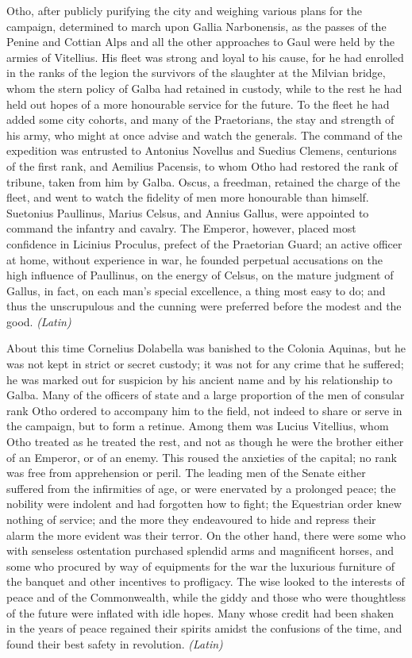 Otho, after publicly purifying the city and weighing various plans for the campaign, determined to march upon Gallia Narbonensis, as the passes of the Penine and Cottian Alps and all the other approaches to Gaul were held by the armies of Vitellius. His fleet was strong and loyal to his cause, for he had enrolled in the ranks of the legion the survivors of the slaughter at the Milvian bridge, whom the stern policy of Galba had retained in custody, while to the rest he had held out hopes of a more honourable service for the future. To the fleet he had added some city cohorts, and many of the Praetorians, the stay and strength of his army, who might at once advise and watch the generals. The command of the expedition was entrusted to Antonius Novellus and Suedius Clemens, centurions of the first rank, and Aemilius Pacensis, to whom Otho had restored the rank of tribune, taken from him by Galba. Oscus, a freedman, retained the charge of the fleet, and went to watch the fidelity of men more honourable than himself. Suetonius Paullinus, Marius Celsus, and Annius Gallus, were appointed to command the infantry and cavalry. The Emperor, however, placed most confidence in Licinius Proculus, prefect of the Praetorian Guard; an active officer at home, without experience in war, he founded perpetual accusations on the high influence of Paullinus, on the energy of Celsus, on the mature judgment of Gallus, in fact, on each man's special excellence, a thing most easy to do; and thus the unscrupulous and the cunning were preferred before the modest and the good. \emph{(Latin)}


About this time Cornelius Dolabella was banished to the Colonia Aquinas, but he was not kept in strict or secret custody; it was not for any crime that he suffered; he was marked out for suspicion by his ancient name and by his relationship to Galba. Many of the officers of state and a large proportion of the men of consular rank Otho ordered to accompany him to the field, not indeed to share or serve in the campaign, but to form a retinue. Among them was Lucius Vitellius, whom Otho treated as he treated the rest, and not as though he were the brother either of an Emperor, or of an enemy. This roused the anxieties of the capital; no rank was free from apprehension or peril. The leading men of the Senate either suffered from the infirmities of age, or were enervated by a prolonged peace; the nobility were indolent and had forgotten how to fight; the Equestrian order knew nothing of service; and the more they endeavoured to hide and repress their alarm the more evident was their terror. On the other hand, there were some who with senseless ostentation purchased splendid arms and magnificent horses, and some who procured by way of equipments for the war the luxurious furniture of the banquet and other incentives to profligacy. The wise looked to the interests of peace and of the Commonwealth, while the giddy and those who were thoughtless of the future were inflated with idle hopes. Many whose credit had been shaken in the years of peace regained their spirits amidst the confusions of the time, and found their best safety in revolution. \emph{(Latin)}

